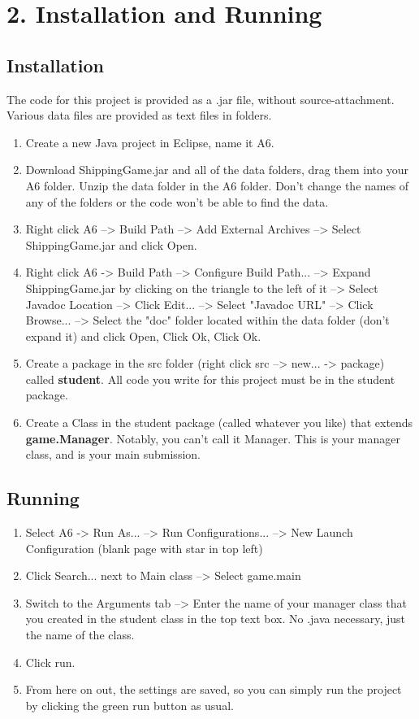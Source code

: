 \documentclass[11pt]{article}
\begin{document}
\newpage
\section{2. Installation and Running}
\subsection{Installation}
The code for this project is provided as a .jar file, without source-attachment. Various data files are provided as text files in folders.
\begin{enumerate}
\item Create a new Java project in Eclipse, name it A6.
\item Download ShippingGame.jar and all of the data folders, drag them into your A6 folder. Unzip the data folder in the A6 folder. Don't change the names of any of the folders or the code won't be able to find the data.
\item Right click A6 --> Build Path --> Add External Archives --> Select ShippingGame.jar and click Open.
\item Right click A6 -> Build Path --> Configure Build Path... --> Expand ShippingGame.jar by clicking on the triangle to the left of it --> Select Javadoc Location --> Click Edit... --> Select "Javadoc URL" --> Click Browse... --> Select the "doc" folder located within the data folder (don't expand it) and click Open, Click Ok, Click Ok.
\item Create a package in the src folder (right click src --> new... -> package) called \textbf{student}. All code you write for this project must be in the student package.
\item Create a Class in the student package (called whatever you like) that extends \textbf{game.Manager}. Notably, you can't call it Manager. This is your manager class, and is your main submission.
\end{enumerate}

\subsection{Running}
\begin{enumerate}
\item Select A6 -> Run As... --> Run Configurations... --> New Launch Configuration (blank page with star in top left)
\item Click Search... next to Main class --> Select game.main
\item Switch to the Arguments tab --> Enter the name of your manager class that you created in the student class in the top text box. No .java necessary, just the name of the class.
\item Click run.
\item From here on out, the settings are saved, so you can simply run the project by clicking the green run button as usual.
\end{enumerate}
\end{document}
